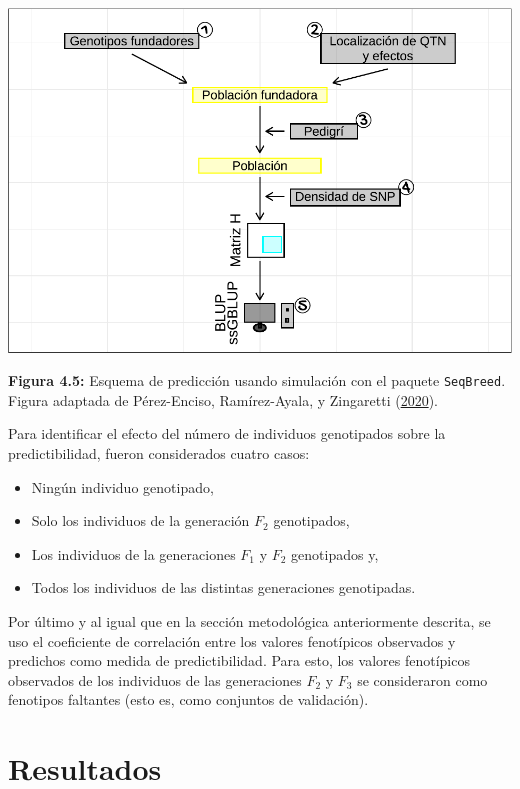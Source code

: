 \documentclass[11pt,spanish,a4paper,oneside,]{book} %
\begin{document}
\begin{center}\includegraphics[width=1\linewidth]{figures/Esquema_2} \end{center}

\noindent
\textbf{Figura 4.5:} Esquema de predicción usando simulación con el paquete \texttt{SeqBreed}. Figura adaptada de Pérez-Enciso, Ramírez-Ayala, y Zingaretti (\protect\hyperlink{ref-cite:47}{2020}).

\hspace*{1em}

Para identificar el efecto del número de individuos genotipados sobre la predictibilidad, fueron considerados cuatro casos:

\begin{itemize}
\item
  Ningún individuo genotipado,
\item
  Solo los individuos de la generación \(F_{2}\) genotipados,
\item
  Los individuos de la generaciones \(F_{1}\) y \(F_{2}\) genotipados y,
\item
  Todos los individuos de las distintas generaciones genotipadas.
\end{itemize}

Por último y al igual que en la sección metodológica anteriormente descrita, se uso el coeficiente de correlación entre los valores fenotípicos observados y predichos como medida de predictibilidad. Para esto, los valores fenotípicos observados de los individuos de las generaciones \(F_{2}\) y \(F_{3}\) se consideraron como fenotipos faltantes (esto es, como conjuntos de validación).

\hypertarget{resultados}{%
\chapter{Resultados}\label{resultados}}
\end{document}
